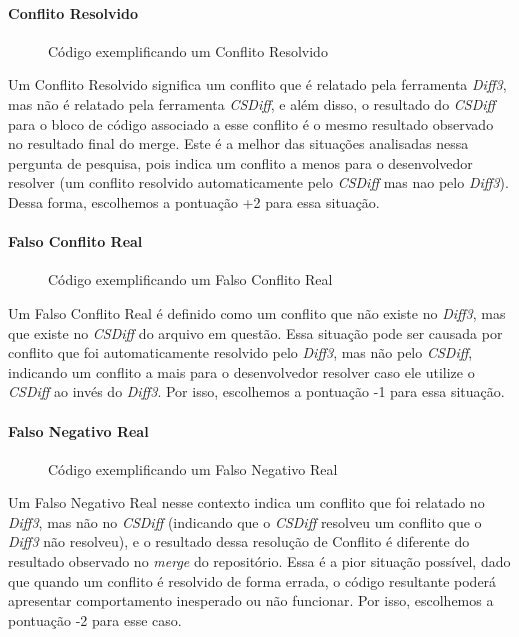 \paragraph{Conflito Resolvido}
\begin{figure}[ht]
	\begin{center}
		
		\caption{Código exemplificando um Conflito Resolvido}\label{conflito_resolvido}
	\end{center}
\end{figure}
Um Conflito Resolvido significa um conflito que é relatado pela ferramenta \emph{Diff3},
mas não é relatado pela ferramenta \emph{CSDiff}, e
além disso, o resultado do \emph{CSDiff} para o bloco de código associado a esse conflito é o mesmo resultado
observado no resultado
final do merge. Este é a melhor das situações analisadas nessa pergunta de pesquisa, pois indica um conflito a menos para o
desenvolvedor resolver (um conflito resolvido automaticamente pelo \emph{CSDiff} mas nao pelo \emph{Diff3}). Dessa forma,
escolhemos a pontuação +2 para essa situação.
\paragraph{Falso Conflito Real}
\begin{figure}[ht]
	\begin{center}
		
		\caption{Código exemplificando um Falso Conflito Real}\label{falso_conflito_real}
	\end{center}
\end{figure}
Um Falso Conflito Real é definido como um conflito que não existe
no \emph{Diff3}, mas que existe no \emph{CSDiff} do arquivo em questão. Essa
situação pode ser causada por conflito que foi automaticamente
resolvido pelo \emph{Diff3}, mas não pelo \emph{CSDiff}, indicando um conflito
a mais para o desenvolvedor resolver caso ele utilize o \emph{CSDiff}
ao invés do \emph{Diff3}. Por isso, escolhemos a pontuação -1 para essa
situação.
\paragraph{Falso Negativo Real}
\begin{figure}[ht]
	\begin{center}
		
		\caption{Código exemplificando um Falso Negativo Real}\label{falso_negativo_real}
	\end{center}
\end{figure}
Um Falso Negativo Real nesse contexto indica um conflito que foi relatado no
\emph{Diff3}, mas não no \emph{CSDiff} (indicando que
o \emph{CSDiff} resolveu um conflito que o \emph{Diff3} não resolveu),
e o resultado dessa resolução de Conflito é diferente do resultado
observado no \emph{merge} do repositório. Essa é a pior situação possível,
dado que quando um conflito é resolvido de forma errada,
o código resultante poderá apresentar comportamento inesperado ou não funcionar. Por
isso, escolhemos a pontuação -2 para esse caso.

